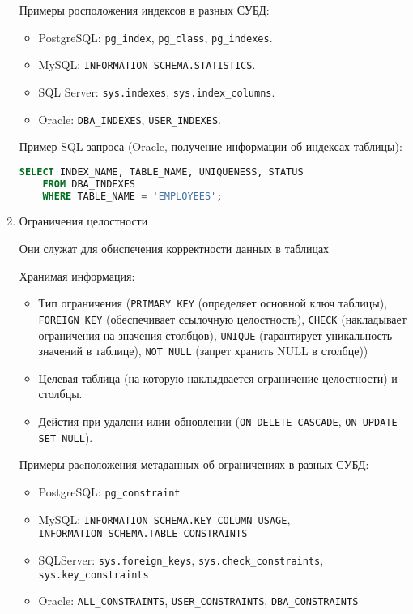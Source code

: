 \begin{enumerate}
    Примеры росположения индексов в разных СУБД:
    \begin{itemize}
        \item PostgreSQL: \texttt{pg\_index}, \texttt{pg\_class}, \texttt{pg\_indexes}.
        \item MySQL: \texttt{INFORMATION\_SCHEMA.STATISTICS}.
        \item SQL Server: \texttt{sys.indexes}, \texttt{sys.index\_columns}.
        \item Oracle: \texttt{DBA\_INDEXES}, \texttt{USER\_INDEXES}.
    \end{itemize}

    Пример SQL-запроса (Oracle, получение информации об индексах таблицы):
    \begin{lstlisting}[language=SQL]
    SELECT INDEX_NAME, TABLE_NAME, UNIQUENESS, STATUS 
    FROM DBA_INDEXES 
    WHERE TABLE_NAME = 'EMPLOYEES';
    \end{lstlisting}

    \item Ограничения целостности \autocites[§51.13]{PostgreSQLdocc51}[§28.3.42]{Mysqldoc1}{MicrosoftLearnSQLserverTab}

    Они служат для обиспечения корректности данных в таблицах

    Хранимая информация:
    \begin{itemize}
        \item Тип ограничения (\texttt{PRIMARY KEY} (определяет основной ключ таблицы), \texttt{FOREIGN KEY} (обеспечивает ссылочную целостность), \texttt{CHECK} (накладывает ограничения на значения столбцов), \texttt{UNIQUE} (гарантирует уникальность значений в таблице), \texttt{NOT NULL} (запрет хранить NULL в столбце))
        \item Целевая таблица (на которую наклыдвается ограничение целостности) и столбцы.
        \item Дейстия при удалени илии обновлении (\texttt{ON DELETE CASCADE}, \texttt{ON UPDATE SET NULL}).
    \end{itemize}

    Примеры раcположения метаданных об ограничениях в разных СУБД:
    \begin{itemize}
        \item PostgreSQL: \texttt{pg\_constraint}
        \item MySQL: \texttt{INFORMATION\_SCHEMA.KEY\_COLUMN\_USAGE}, \texttt{INFORMATION\_SCHEMA.TABLE\_CONSTRAINTS}
        \item SQLServer: \texttt{sys.foreign\_keys}, \texttt{sys.check\_constraints}, \texttt{sys.key\_constraints}
        \item Oracle: \texttt{ALL\_CONSTRAINTS}, \texttt{USER\_CONSTRAINTS}, \texttt{DBA\_CONSTRAINTS}
    \end{itemize}


\end{enumerate}
